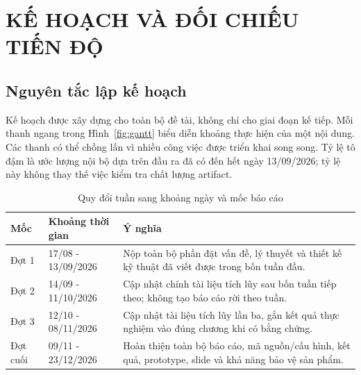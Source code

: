 \documentclass[12pt,a4paper,oneside]{report}
\begin{document}
\clearpage
\chapter*{KẾ HOẠCH VÀ ĐỐI CHIẾU TIẾN ĐỘ}

\section*{Nguyên tắc lập kế hoạch}

Kế hoạch được xây dựng cho toàn bộ đề tài, không chỉ cho giai đoạn kế tiếp. Mỗi thanh ngang trong Hình~\ref{fig:gantt} biểu diễn khoảng thực hiện của một nội dung. Các thanh có thể chồng lấn vì nhiều công việc được triển khai song song. Tỷ lệ tô đậm là ước lượng nội bộ dựa trên đầu ra đã có đến hết ngày 13/09/2026; tỷ lệ này không thay thế việc kiểm tra chất lượng artifact.

\begin{table}[H]
\centering
\caption{Quy đổi tuần sang khoảng ngày và mốc báo cáo}
\label{tab:periods}
\renewcommand{\arraystretch}{1.5}
\begin{tabularx}{\textwidth}{L{2.5cm}L{4.2cm}Y}
\toprule
\textbf{Mốc} & \textbf{Khoảng thời gian} & \textbf{Ý nghĩa} \\
\midrule
Đợt 1 & 17/08 - 13/09/2026 & Nộp toàn bộ phần đặt vấn đề, lý thuyết và thiết kế kỹ thuật đã viết được trong bốn tuần đầu. \\
Đợt 2 & 14/09 - 11/10/2026 & Cập nhật chính tài liệu tích lũy sau bốn tuần tiếp theo; không tạo báo cáo rời theo tuần. \\
Đợt 3 & 12/10 - 08/11/2026 & Cập nhật tài liệu tích lũy lần ba, gắn kết quả thực nghiệm vào đúng chương khi có bằng chứng. \\
Đợt cuối & 09/11 - 23/12/2026 & Hoàn thiện toàn bộ báo cáo, mã nguồn/cấu hình, kết quả, prototype, slide và khả năng bảo vệ sản phẩm. \\
\bottomrule
\end{tabularx}
\end{table}
\end{document}
